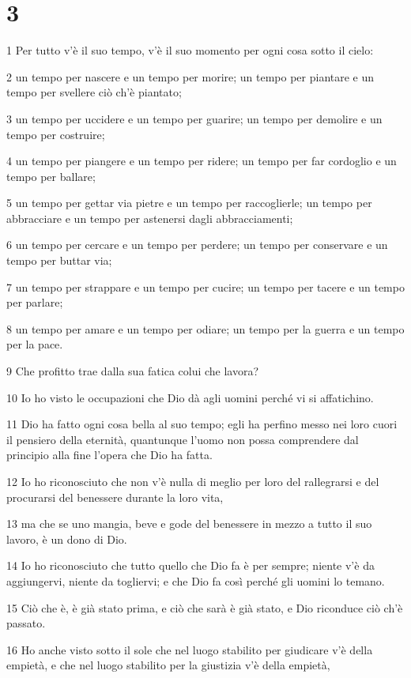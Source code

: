 \chapter{3}

\par 1 Per tutto v'è il suo tempo, v'è il suo momento per ogni cosa sotto il cielo:
\par 2 un tempo per nascere e un tempo per morire; un tempo per piantare e un tempo per svellere ciò ch'è piantato;
\par 3 un tempo per uccidere e un tempo per guarire; un tempo per demolire e un tempo per costruire;
\par 4 un tempo per piangere e un tempo per ridere; un tempo per far cordoglio e un tempo per ballare;
\par 5 un tempo per gettar via pietre e un tempo per raccoglierle; un tempo per abbracciare e un tempo per astenersi dagli abbracciamenti;
\par 6 un tempo per cercare e un tempo per perdere; un tempo per conservare e un tempo per buttar via;
\par 7 un tempo per strappare e un tempo per cucire; un tempo per tacere e un tempo per parlare;
\par 8 un tempo per amare e un tempo per odiare; un tempo per la guerra e un tempo per la pace.
\par 9 Che profitto trae dalla sua fatica colui che lavora?
\par 10 Io ho visto le occupazioni che Dio dà agli uomini perché vi si affatichino.
\par 11 Dio ha fatto ogni cosa bella al suo tempo; egli ha perfino messo nei loro cuori il pensiero della eternità, quantunque l'uomo non possa comprendere dal principio alla fine l'opera che Dio ha fatta.
\par 12 Io ho riconosciuto che non v'è nulla di meglio per loro del rallegrarsi e del procurarsi del benessere durante la loro vita,
\par 13 ma che se uno mangia, beve e gode del benessere in mezzo a tutto il suo lavoro, è un dono di Dio.
\par 14 Io ho riconosciuto che tutto quello che Dio fa è per sempre; niente v'è da aggiungervi, niente da togliervi; e che Dio fa così perché gli uomini lo temano.
\par 15 Ciò che è, è già stato prima, e ciò che sarà è già stato, e Dio riconduce ciò ch'è passato.
\par 16 Ho anche visto sotto il sole che nel luogo stabilito per giudicare v'è della empietà, e che nel luogo stabilito per la giustizia v'è della empietà,
